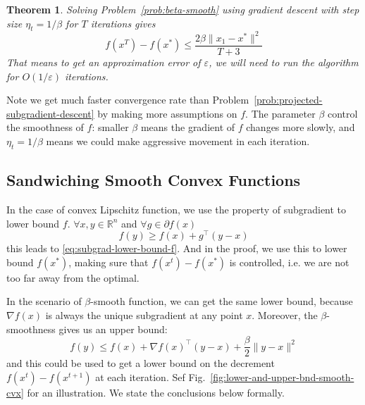 \documentclass{scrartcl}
\newtheorem{theorem}{Theorem}
\newcommand{\RR}{\mathbb{R}}
\begin{document}
\begin{theorem}
  Solving Problem~\ref{prob:beta-smooth} using gradient descent with step size $\eta_t=1/\beta$ for
  $T$ iterations gives
  \begin{equation}
    f(x^T)-f(x^*) \leq \frac{2\beta \|x_1-x^*\|^2}{T+3}
  \end{equation}
  That means to get an approximation error of $\varepsilon$, we will need to run the algorithm for
  $O(1/\varepsilon)$ iterations.
  \label{thm:beta-smooth}
\end{theorem}
Note we get much faster convergence rate than Problem~\ref{prob:projected-subgradient-descent} by
making more assumptions on $f$. The parameter $\beta$ control the smoothness of $f$: smaller $\beta$
means the gradient of $f$ changes more slowly, and $\eta_t=1/\beta$ means we could make aggressive
movement in each iteration.

\subsection{Sandwiching Smooth Convex Functions}

In the case of convex Lipschitz function, we use the property of subgradient to lower bound $f$.
$\forall x,y\in\RR^n$ and $\forall g\in\partial f(x)$
\[
  f(y) \geq f(x) + g^\top (y-x)
\]
this leads to \eqref{eq:subgrad-lower-bound-f}. And in the proof, we use this to lower bound $f
(x^*)$, making sure that $f(x^t)-f(x^*)$ is controlled, i.e. we are not too far away from the
optimal.

In the scenario of $\beta$-smooth function, we can get the same lower bound, because $\nabla f(x)$
is always the unique subgradient at any point $x$. Moreover, the $\beta$-smoothness gives us an
upper bound:
\[
  f(y) \leq f(x) + \nabla f(x)^\top (y-x) + \frac{\beta}{2}\|y-x\|^2
\]
and this could be used to get a lower bound on the decrement $f(x^t)-f(x^{t+1})$ at each iteration.
Sef Fig.~\ref{fig:lower-and-upper-bnd-smooth-cvx} for an illustration. We state the conclusions
below formally.
\end{document}
